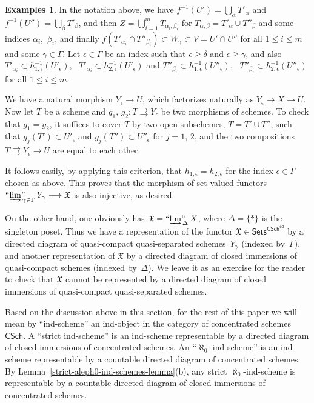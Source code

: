 \documentclass[12pt,a4paper]{amsart}
\newcommand{\+}{\protect\nobreakdash-}
\renewcommand{\:}{\colon}
\newcommand{\rarrow}{\longrightarrow}
\newcommand{\Sets}{\mathsf{Sets}}
\newcommand{\CSch}{\mathsf{CSch}}
\newcommand{\sop}{\mathsf{op}}
\newcommand{\ilim}
 {\mathop{\text{\normalfont``$\varinjlim$''\!\!}}\nolimits}
\newcommand{\fX}{\mathfrak X}
\theoremstyle{plain}
\theoremstyle{definition}
\newtheorem{exs}[thm]{Examples}
\begin{document}
\begin{exs}
 In the notation above, we have $f^{-1}(U')=\bigcup_\alpha
T'_\alpha$ and $f^{-1}(U'')=\bigcup_\beta T'_\beta$, and
then $Z=\bigcup_{i=1}^mT_{\alpha_i,\beta_i}$ for
$T_{\alpha,\beta}=T'_\alpha\cup T''_\beta$ and
some indices $\alpha_i$,~$\beta_i$, and finally
$f(T'_{\alpha_i}\cap T''_{\beta_i}) \subset W_\gamma\subset
V=U'\cap U''$ for all $1\le i\le m$ and some $\gamma\in\Gamma$.
 Let $\epsilon\in\Gamma$ be an index such that $\epsilon\ge\delta$
and $\epsilon\ge\gamma$, and also $T'_{\alpha_i}\subset
h_{1,\epsilon}^{-1}(U'_\epsilon)$, \
$T'_{\alpha_i}\subset h_{2,\epsilon}^{-1}(U'_\epsilon)$ and
$T''_{\beta_i}\subset h_{1,\epsilon}^{-1}(U''_\epsilon)$, \
$T''_{\beta_i}\subset h_{2,\epsilon}^{-1}(U''_\epsilon)$ for all
$1\le i\le m$.

 We have a natural morphism $Y_\epsilon\rarrow U$, which factorizes
naturally as $Y_\epsilon\rarrow X\rarrow U$.
 Now let $T$ be a scheme and $g_1$, $g_2\:T\rightrightarrows Y_\epsilon$
be two morphisms of schemes.
 To check that $g_1=g_2$, it suffices to cover $T$ by two open
subschemes, $T=T'\cup T''$, such that $g_j(T')\subset U'_\epsilon$
and $g_j(T'')\subset U''_\epsilon$ for $j=1$, $2$, and the two
compositions $T\rightrightarrows Y_\epsilon\rarrow U$ are equal
to each other.

 It follows easily, by applying this criterion, that
$h_{1,\epsilon}=h_{2,\epsilon}$ for the index $\epsilon\in\Gamma$
chosen as above.
 This proves that the morphism of set-valued functors
$\ilim_{\gamma\in\Gamma}Y_\gamma\rarrow\fX$ is also injective,
as desired.

 On the other hand, one obviously has $\fX=\ilim_\Delta X$,
where $\Delta=\{*\}$ is the singleton poset.
 Thus we have a representation of the functor
$\fX\in\Sets^{\CSch^\sop}$ by a directed diagram of quasi-compact
quasi-separated schemes~$Y_\gamma$ (indexed by~$\Gamma$), and
another representation of $\fX$ by a directed diagram of closed
immersions of quasi-compact schemes (indexed by~$\Delta$).
 We leave it as an exercise for the reader to check that $\fX$
cannot be represented by a directed diagram of closed immersions
of quasi-compact quasi-separated schemes.
\end{exs}

 Based on the discussion above in this section, for the rest of
this paper we will mean by ``ind-scheme'' an ind-object in
the category of concentrated schemes $\CSch$.
 A ``strict ind-scheme'' is an ind-scheme representable by
a directed diagram of closed immersions of concentrated schemes.
 An ``$\aleph_0$\+ind-scheme'' is an ind-scheme representable by
a countable directed diagram of concentrated schemes.
 By Lemma~\ref{strict-aleph0-ind-schemes-lemma}(b), any strict
$\aleph_0$\+ind-scheme is representable by a countable directed
diagram of closed immersions of concentrated schemes.
\end{document}
